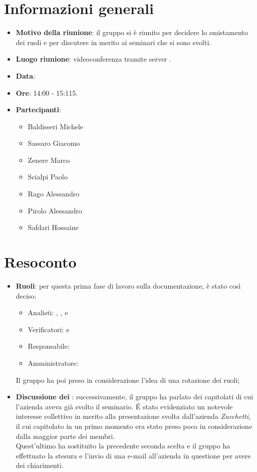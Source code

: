 \section{Informazioni generali}
\begin{itemize}
\item \textbf{Motivo della riunione}: il gruppo si è riunito per decidere lo smistamento dei ruoli e per discutere in merito ai seminari che si sono svolti.
\item \textbf{Luogo riunione}: videoconferenza tramite server .
\item \textbf{Data}: \Data{}
\item \textbf{Ore}: 14:00 - 15:115.
\item \textbf{Partecipanti}:
	\begin{itemize}
	\item Baldisseri Michele
	\item Sassaro Giacomo
	\item Zenere Marco
	\item Scialpi Paolo
	\item Rago Alessandro
	\item Pirolo Alessandro
	\item Safdari Hossaine
	\end{itemize}
\end{itemize}
\newpage
\section{Resoconto}
\begin{itemize}
\item \textbf{Ruoli}: per questa prima fase di lavoro sulla documentazione, è stato così deciso:
\begin{itemize}
\item Analisti: \SH{}, \ZM{}, \RA{} e \SP{}
\item Verificatori: \PA{} e \BM{} 
\item Responsabile: \SG{}
\item Amministratore: \BM{}
\end{itemize}
Il gruppo ha poi preso in considerazione l'idea di una rotazione dei ruoli;

\item \textbf{Discussione dei }: successivamente, il gruppo ha parlato dei capitolati di cui l'azienda aveva già svolto il seminario. \'E stato evidenziato un notevole interesse collettivo in merito alla presentazione svolta dall'azienda \textit{Zucchetti}, il cui capitolato in un primo momento era stato preso poco in considerazione dalla maggior parte dei membri.\\ Quest'ultimo ha sostituito la precedente seconda scelta e il gruppo ha effettuato la stesura e l'invio di una e-mail all'azienda in questione per avere dei chiarimenti.
\end{itemize}